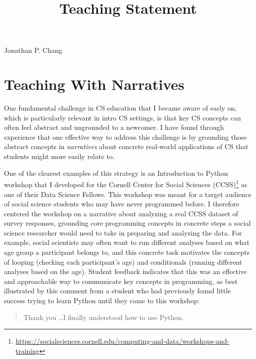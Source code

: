 \documentclass[12pt,letterpaper]{article}
\title{Teaching Statement}
\newcommand\intropar\lateachingintro
\newcommand\intropar\genteachingintro
\begin{document}
\maketitle

{\centering Jonathan P. Chang \par}

\vspace{0.5\baselineskip}
\intropar

\section{Teaching With Narratives}
One fundamental challenge in CS education that I became aware of early on, which is particularly relevant in intro CS settings, is that key CS concepts can often feel abstract and ungrounded to a newcomer.
I have found through experience that one effective way to address this challenge is by grounding those abstract concepts in \emph{narratives} about concrete real-world applications of CS that students might more easily relate to.

One of the clearest examples of this strategy is an Introduction to Python workshop that I developed for the Cornell Center for Social Sciences (CCSS)\footnote{\url{https://socialsciences.cornell.edu/computing-and-data/workshops-and-training}} as one of their Data Science Fellows.
This workshop was meant for a target audience of social science students who may have never programmed before.
I therefore centered the workshop on a narrative about analyzing a real CCSS dataset of survey responses, grounding core programming concepts in concrete steps a social science researcher would need to take in preparing and analyzing the data.
For example, social scientists may often want to run different analyses based on what age group a participant belongs to, and this concrete task motivates the concepts of looping (checking each participant's age) and conditionals (running different analyses based on the age).
Student feedback indicates that this was an effective and approachable way to communicate key concepts in programming, as best illustrated by this comment from a student who had previously found little success trying to learn Python until they came to this workshop:
\begin{quote}
    Thank you%
    {\dots}I finally understood how to use Python.
\end{quote}
\end{document}
